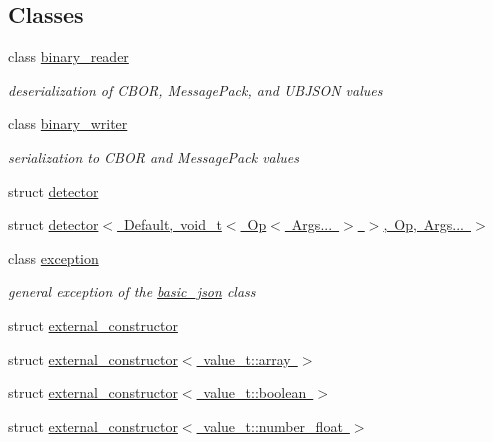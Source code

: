 \subsection*{Classes}
\begin{DoxyCompactItemize}
\item 
class \mbox{\hyperlink{classnlohmann_1_1detail_1_1binary__reader}{binary\+\_\+reader}}
\begin{DoxyCompactList}\small\item\em deserialization of C\+B\+OR, Message\+Pack, and U\+B\+J\+S\+ON values \end{DoxyCompactList}\item 
class \mbox{\hyperlink{classnlohmann_1_1detail_1_1binary__writer}{binary\+\_\+writer}}
\begin{DoxyCompactList}\small\item\em serialization to C\+B\+OR and Message\+Pack values \end{DoxyCompactList}\item 
struct \mbox{\hyperlink{structnlohmann_1_1detail_1_1detector}{detector}}
\item 
struct \mbox{\hyperlink{structnlohmann_1_1detail_1_1detector_3_01_default_00_01void__t_3_01_op_3_01_args_8_8_8_01_4_01_4_00_01_op_00_01_args_8_8_8_01_4}{detector$<$ Default, void\+\_\+t$<$ Op$<$ Args... $>$ $>$, Op, Args... $>$}}
\item 
class \mbox{\hyperlink{classnlohmann_1_1detail_1_1exception}{exception}}
\begin{DoxyCompactList}\small\item\em general exception of the \mbox{\hyperlink{classnlohmann_1_1basic__json}{basic\+\_\+json}} class \end{DoxyCompactList}\item 
struct \mbox{\hyperlink{structnlohmann_1_1detail_1_1external__constructor}{external\+\_\+constructor}}
\item 
struct \mbox{\hyperlink{structnlohmann_1_1detail_1_1external__constructor_3_01value__t_1_1array_01_4}{external\+\_\+constructor$<$ value\+\_\+t\+::array $>$}}
\item 
struct \mbox{\hyperlink{structnlohmann_1_1detail_1_1external__constructor_3_01value__t_1_1boolean_01_4}{external\+\_\+constructor$<$ value\+\_\+t\+::boolean $>$}}
\item 
struct \mbox{\hyperlink{structnlohmann_1_1detail_1_1external__constructor_3_01value__t_1_1number__float_01_4}{external\+\_\+constructor$<$ value\+\_\+t\+::number\+\_\+float $>$}}
\item 

\end{DoxyCompactItemize}
